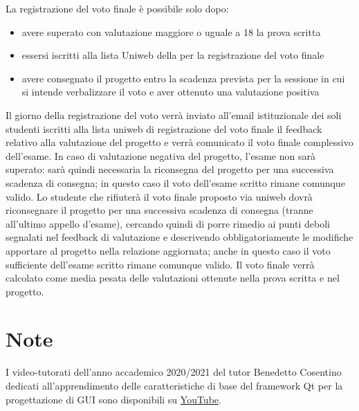 \documentclass[10pt,a4paper,oneside]{article}
\begin{document}
La registrazione del voto finale è possibile solo dopo:
\begin{itemize}
 \item avere superato con valutazione maggiore o uguale a 18 la prova scritta
 \item essersi iscritti alla lista Uniweb della per la registrazione del voto finale
 \item avere consegnato il progetto entro la scadenza prevista per la sessione in cui si intende verbalizzare il voto e aver ottenuto una valutazione positiva
\end{itemize}
Il giorno della registrazione del voto verrà inviato all'email istituzionale dei soli studenti iscritti alla lista uniweb di registrazione del voto finale il feedback relativo alla valutazione del progetto e verrà comunicato il voto finale complessivo dell'esame. In caso di valutazione negativa del progetto, l'esame non sarà superato: sarà quindi necessaria la riconsegna del progetto per una successiva scadenza di consegna; in questo caso il voto dell'esame scritto rimane comunque valido. Lo studente che rifiuterà il voto finale proposto via uniweb dovrà riconsegnare il progetto per una successiva scadenza di consegna (tranne all'ultimo appello d'esame), cercando quindi di porre rimedio ai punti deboli segnalati nel feedback di valutazione e descrivendo obbligatoriamente le modifiche apportare al progetto nella relazione aggiornata; anche in questo caso il voto sufficiente dell'esame scritto rimane comunque valido. Il voto finale verrà calcolato come media pesata delle valutazioni ottenute nella prova scritta e nel progetto.

\section{Note}
I video-tutorati dell'anno accademico 2020/2021 del tutor Benedetto Cosentino dedicati all'apprendimento delle caratteristiche di base del framework Qt per la progettazione di GUI sono disponibili su \href{https://www.youtube.com/playlist?list=PLH_Fd-836q-VcqWnnzsq3GOF2-0i_Az7p}{YouTube}.
\end{document}
